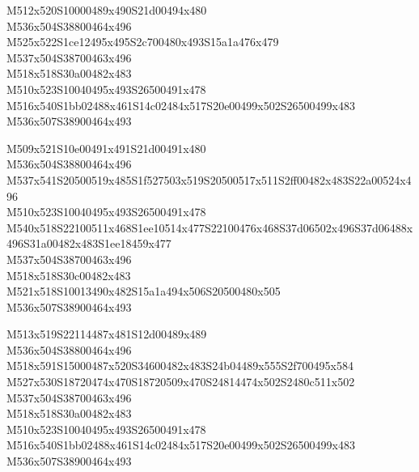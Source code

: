 \documentclass{article}
\begin{document}
\begin{multicols}{5}
\begin{center}

M512x520S10000489x490S21d00494x480 %
\\M536x504S38800464x496 %
\\M525x522S1ce12495x495S2c700480x493S15a1a476x479 %
\\M537x504S38700463x496 %
\\M518x518S30a00482x483 %
\\M510x523S10040495x493S26500491x478 %
\\M516x540S1bb02488x461S14c02484x517S20e00499x502S26500499x483 %
\\M536x507S38900464x493 %
\vfil
\columnbreak

M509x521S10e00491x491S21d00491x480 %
\\M536x504S38800464x496 %
\\M537x541S20500519x485S1f527503x519S20500517x511S2ff00482x483S22a00524x496 %
\\M510x523S10040495x493S26500491x478 %
\\M540x518S22100511x468S1ee10514x477S22100476x468S37d06502x496S37d06488x496S31a00482x483S1ee18459x477 %
\\M537x504S38700463x496 %
\\M518x518S30c00482x483 %
\\M521x518S10013490x482S15a1a494x506S20500480x505 %
\\M536x507S38900464x493 %
\vfil
\columnbreak

M513x519S22114487x481S12d00489x489 %
\\M536x504S38800464x496 %
\\M518x591S15000487x520S34600482x483S24b04489x555S2f700495x584 %
\\M527x530S18720474x470S18720509x470S24814474x502S2480c511x502 %
\\M537x504S38700463x496 %
\\M518x518S30a00482x483 %
\\M510x523S10040495x493S26500491x478 %
\\M516x540S1bb02488x461S14c02484x517S20e00499x502S26500499x483 %
\\M536x507S38900464x493 %
\vfil
\columnbreak


\end{center}
\end{multicols}
\end{document}
